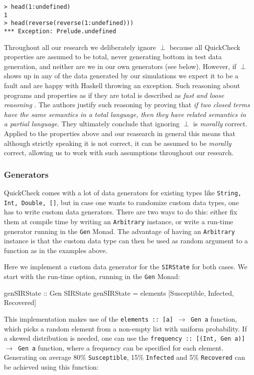 \begin{verbatim}
> head(1:undefined)
1
> head(reverse(reverse(1:undefined)))
*** Exception: Prelude.undefined
\end{verbatim}

Throughout all our research we deliberately ignore $\perp$ because all QuickCheck properties are assumed to be total, never generating bottom in test data generation, and neither are we in our own generators (see below). However, if $\perp$ shows up in any of the data generated by our simulations we expect it to be a fault and are happy with Haskell throwing an exception. Such reasoning about programs and properties as if they are total is described as \textit{fast and loose reasoning} \cite{danielsson2006fast}. The authors justify such reasoning by proving that \textit{if two closed terms have the same semantics in a total language, then they have related semantics in a partial language}. They ultimately conclude that ignoring $\perp$ is \textit{morally} correct. Applied to the properties above and our reasearch in general this means that although strictly speaking it is not correct, it can be assumed to be \textit{morally} correct, allowing us to work with such assumptions throughout our research.

\subsubsection{Generators}
QuickCheck comes with a lot of data generators for existing types like \texttt{String, Int, Double, []}, but in case one wants to randomize custom data types, one has to write custom data generators. There are two ways to do this: either fix them at compile time by writing an \texttt{Arbitrary} instance, or write a run-time generator running in the \texttt{Gen} Monad. The advantage of having an \texttt{Arbitrary} instance is that the custom data type can then be used as random argument to a function as in the examples above.

Here we implement a custom data generator for the \texttt{SIRState} for both cases. We start with the run-time option, running in the \texttt{Gen} Monad:

\begin{HaskellCode}
genSIRState :: Gen SIRState
genSIRState = elements [Susceptible, Infected, Recovered]
\end{HaskellCode}

This implementation makes use of the \texttt{elements :: [a] $\rightarrow$ Gen a} function, which picks a random element from a non-empty list with uniform probability. If a skewed distribution is needed, one can use the \texttt{frequency :: [(Int, Gen a)] $\rightarrow$ Gen a} function, where a frequency can be specified for each element. Generating on average 80\% \texttt{Susceptible}, 15\% \texttt{Infected} and 5\% \texttt{Recovered} can be achieved using this function:

